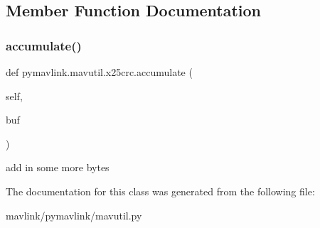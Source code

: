\subsection{Member Function Documentation}
\mbox{\label{classpymavlink_1_1mavutil_1_1x25crc_a0b923d79c74f524672adb0dc2ab0c337}} 
\subsubsection{\texorpdfstring{accumulate()}{accumulate()}}
{\footnotesize\ttfamily def pymavlink.\+mavutil.\+x25crc.\+accumulate (\begin{DoxyParamCaption}\item[{}]{self,  }\item[{}]{buf }\end{DoxyParamCaption})}

\begin{DoxyVerb}add in some more bytes\end{DoxyVerb}
 

The documentation for this class was generated from the following file\+:\begin{DoxyCompactItemize}
\item 
mavlink/pymavlink/mavutil.\+py\end{DoxyCompactItemize}
